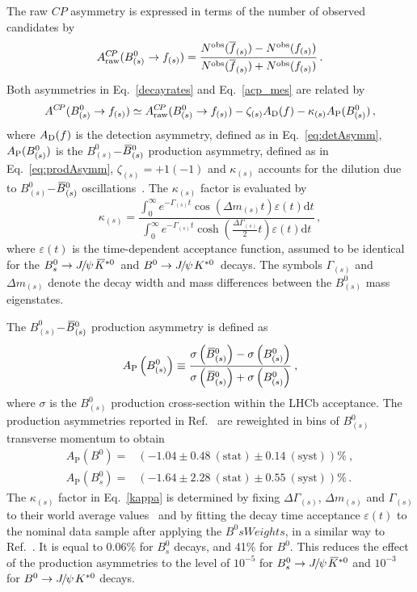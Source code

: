 \documentclass[12pt,a4paper]{article}
\newcommand{\CP}{\ensuremath{{C\!P}}\xspace}
\newcommand{\sweights} {\mbox{$sW\!eights$}\xspace}
\def\PJ      {\ensuremath{J}\xspace}
\def\CP                {\ensuremath{C\!P}\xspace}
\def\Ppsi {\ensuremath{\psi}\xspace}
\def\jpsi     {{\ensuremath{{\PJ\mskip -3mu/\mskip -2mu\Ppsi\mskip 2mu}}}\xspace}
\def\Bbar    {\kern 0.18em\overline{\kern -0.18em B}{}\xspace}
\newcommand{\Bs}{\ensuremath{B^0_s}\xspace}
\newcommand{\Bd}{\ensuremath{B^0}\xspace}
\newcommand{\BdJpsiKst}{\ensuremath{B^0\to \jpsi K^{*0}}\xspace}
\newcommand{\BsJpsiKst}{\ensuremath{B^0_s\to \jpsi \Kstarzb}\xspace}
\newcommand{\BdJKst}{\BdJpsiKst}
\newcommand{\BsJKst}{\BsJpsiKst}
\def\Kbar  {\kern 0.2em\overline{\kern -0.2em K}{}\xspace}
\def\Kstarzb {\ensuremath{\Kbar^{*0}}\xspace}
\begin{document}
The raw \CP asymmetry is expressed in terms of the number of observed candidates by
\begin{equation}
A^{\CP}_{\rm raw}(B^0_{(s)} \to f_{(s)}) = \frac{N^{\rm obs}(\overline{f}_{(s)}) -N^{\rm obs}(f_{(s)}) }{
N^{\rm obs}(\overline{f}_{(s)}) + N^{\rm obs}(f_{(s)})} \,.
\label{acp_mes}
\end{equation}
Both asymmetries in Eq.~\ref{decayrates} and Eq.~\ref{acp_mes} are related by~\cite{LHCB-PAPER-2011-029}
\begin{equation}
A^{\CP}(B^0_{(s)} \to f_{(s)}) \simeq A^{\CP}_{\rm raw}(B^0_{(s)} \to f_{(s)}) - \zeta_{(s)}
A_{\rm D}(f) - \kappa_{(s)}A_{\rm P}(B^0_{(s)})  \,,
\end{equation}
where $ A_{\rm D}(f)$ is the detection asymmetry, defined as in Eq.~\eqref{eq:detAsymm}, $A_{\rm P}(B^0_{(s)})$ is the $B^0_{(s)}$$-$$\Bbar^0_{(s)}$ production asymmetry, defined as in Eq.~\eqref{eq:prodAsymm}, 
$\zeta_{(s)}= +1(-1)$ and $\kappa_{(s)}$ accounts for the dilution due to
$B^0_{(s)}$$-$$\Bbar^0_{(s)}$ oscillations~\cite{LHCb-PAPER-2013-018}. The $\kappa_{(s)}$ factor
is evaluated by
\begin{equation}
\kappa_{(s)} \!=\! \frac{\int_0^\infty \! e^{-\Gamma_{(s)} t} \! \cos \!\left( \Delta m_{(s)} t
\right )\! \varepsilon(t)\mathrm{d}t}{\int_0^\infty \!
e^{-\Gamma_{(s)} t} \! \cosh \!\left( \frac{\Delta \Gamma_{(s)}}{2} t \right )\!
\varepsilon(t)\mathrm{d}t}  \,,
\label{kappa}
\end{equation}
where  $\varepsilon(t)$ is the time-dependent acceptance function, assumed to be identical for the \BsJKst\ and \BdJKst\ decays.  
The symbols $\Gamma_{(s)}$ and $\Delta m_{(s)}$ denote the decay width and mass differences between the $B^0_{(s)}$ mass eigenstates. 

The $B^0_{(s)}$$-$$\Bbar^0_{(s)}$ production asymmetry is defined as
\begin{equation}\label{eq:prodAsymm}
A_{\text{P}}\left(B_{(s)}^0\right) \equiv \frac{\sigma\left(\Bbar_{(s)}^0\right) - \sigma\left(B_{(s)}^0\right)}{ \sigma \left(\Bbar_{(s)}^0\right) + \sigma\left(B_{(s)}^0\right) }\:,
\end{equation}
where $\sigma$ is the $B_{(s)}^0$ production cross-section within the LHCb acceptance. The production asymmetries reported in Ref.~\cite{LHCb-PAPER-2014-042} are reweighted in bins of $B_{(s)}^0$ transverse momentum to obtain
\begin{align}
A_{\text{P}}(\Bd) = & \left(-1.04 \pm 0.48\:(\text{stat}) \pm 0.14\:(\text{syst}) \right)\%\:, \nonumber \\ 
A_{\text{P}}(\Bs) = & \left(-1.64 \pm 2.28\:(\text{stat}) \pm 0.55\:(\text{syst}) \right)\%  \,.  \nonumber
\end{align}
The $\kappa_{(s)}$ factor in Eq.~\ref{kappa} is determined by fixing  $\Delta\Gamma_{(s)}$, $\Delta m_{(s)}$ and  $\Gamma_{(s)}$ to their world average values~\cite{PDG2014} and by fitting the decay time acceptance $\varepsilon(t)$ to the nominal data sample after applying the \Bd \sweights, in a similar way to Ref.~\cite{LHCb-PAPER-2014-053}. 
It is equal to 0.06$\%$ for \Bs decays, and 41$\%$ for \Bd.
This reduces the effect of the production asymmetries to the level of $10^{-5}$ for \BsJpsiKst and $10^{-3}$ for \BdJpsiKst decays. 
\end{document}
